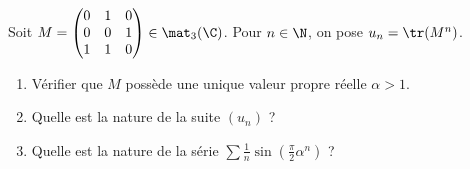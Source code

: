\begin{enonce}
\begin{exercise}[ID={RMS 113/4 87 X/MP},subtitle={},tags={}]
Soit 
$M=
\begin{pmatrix}
    0&1&0\\
    0&0&1\\
    1&1&0
\end{pmatrix}
\in\mat_3(\C)$.
Pour $n\in\N$, on pose $u_n=\tr(M^n)$.
\begin{enumerate}
\item Vérifier que $M$ possède une unique valeur propre réelle $\alpha>1$.
\item Quelle est la nature de la suite $(u_n)$ ?
\item Quelle est la nature de la série $\sum\frac1n\sin\left(\frac\pi2 \alpha^n\right)$ ?
\end{enumerate}
\end{exercise}
\begin{solution}
\end{solution}
\end{enonce}
